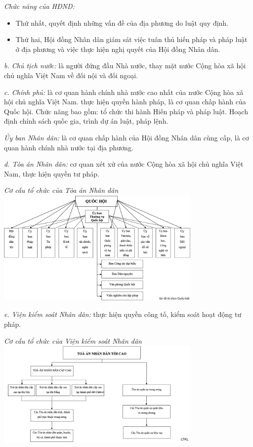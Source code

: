 \documentclass[12pt, a4paper]{article}
\begin{document}
\textit{Chức năng của HĐND:}
\begin{itemize}
  \item Thứ nhất, quyết định những vấn đề của địa phương do luật quy định.
  \item Thứ hai, Hội đồng Nhân dân giám sát việc tuân thủ hiến pháp và pháp luật ở địa phương và việc thực hiện nghị quyết của Hội đồng Nhân dân.
\end{itemize}

\textit{b. Chủ tịch nước:} là người đứng đầu Nhà nước, thay mặt nước Cộng hòa xã hội chủ nghĩa Việt Nam về đối nội và đối ngoại.

\textit{c. Chính phủ:} là cơ quan hành chính nhà nước cao nhất của nước Cộng hòa xã hội chủ nghĩa Việt Nam. thực hiện quyền hành pháp, là cơ quan chấp hành của Quốc hội. Chức năng bao gồm: tổ chức thi hành Hiến pháp và pháp luật. Hoạch định chính sách quốc gia, trình dự án luật, pháp lệnh.

\textit{Ủy ban Nhân dân:} là cơ quan chấp hành của Hội đồng Nhân dân cùng cấp, là cơ quan hành chính nhà nước tại địa phương.

\textit{d. Tòa án Nhân dân:} cơ quan xét xử của nước Cộng hòa xã hội chủ nghĩa Việt Nam, thực hiện quyền tư pháp.
\begin{center}
  \textit{Cơ cấu tổ chức của Tòa án Nhân dân}\\
  \includegraphics[width = 0.75\textwidth]{./image/5.png}
\end{center}

\textit{e. Viện kiểm soát Nhân dân:} thực hiện quyền công tố, kiểm soát hoạt động tư pháp.
\begin{center}
  \textit{Cơ cấu tổ chức của Viện kiểm soát Nhân dân}\\
  \includegraphics[width = 0.75\textwidth]{./image/6.png}
\end{center}
\end{document}
